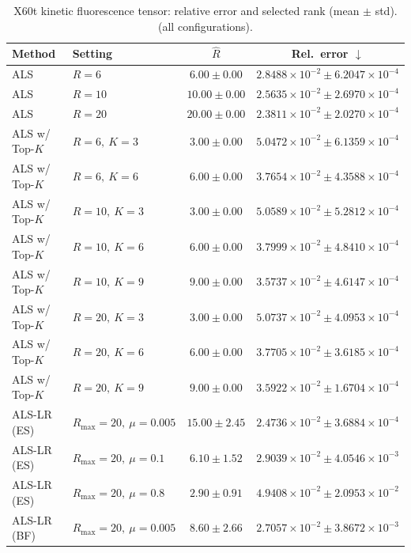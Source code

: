 \begin{table}[t]
\centering
\caption{X60t kinetic fluorescence tensor: relative error and selected rank (mean \(\pm\) std). (all configurations).}
\label{tab:results_I64x12x10x60_R0_rho0.0_noise0.0}
\begin{tabular}{@{}llcc@{}}
\toprule
Method & Setting & \(\hat R\) & Rel.\ error \(\downarrow\) \\ \midrule
ALS & \(R=6\) & \(6.00 \pm 0.00\) & \(2.8488{\times}10^{-2} \pm 6.2047{\times}10^{-4}\) \\
ALS & \(R=10\) & \(10.00 \pm 0.00\) & \(2.5635{\times}10^{-2} \pm 2.6970{\times}10^{-4}\) \\
ALS & \(R=20\) & \(20.00 \pm 0.00\) & \(2.3811{\times}10^{-2} \pm 2.0270{\times}10^{-4}\) \\
ALS w/ Top-\(K\) & \(R=6,\ K=3\) & \(3.00 \pm 0.00\) & \(5.0472{\times}10^{-2} \pm 6.1359{\times}10^{-4}\) \\
ALS w/ Top-\(K\) & \(R=6,\ K=6\) & \(6.00 \pm 0.00\) & \(3.7654{\times}10^{-2} \pm 4.3588{\times}10^{-4}\) \\
ALS w/ Top-\(K\) & \(R=10,\ K=3\) & \(3.00 \pm 0.00\) & \(5.0589{\times}10^{-2} \pm 5.2812{\times}10^{-4}\) \\
ALS w/ Top-\(K\) & \(R=10,\ K=6\) & \(6.00 \pm 0.00\) & \(3.7999{\times}10^{-2} \pm 4.8410{\times}10^{-4}\) \\
ALS w/ Top-\(K\) & \(R=10,\ K=9\) & \(9.00 \pm 0.00\) & \(3.5737{\times}10^{-2} \pm 4.6147{\times}10^{-4}\) \\
ALS w/ Top-\(K\) & \(R=20,\ K=3\) & \(3.00 \pm 0.00\) & \(5.0737{\times}10^{-2} \pm 4.0953{\times}10^{-4}\) \\
ALS w/ Top-\(K\) & \(R=20,\ K=6\) & \(6.00 \pm 0.00\) & \(3.7705{\times}10^{-2} \pm 3.6185{\times}10^{-4}\) \\
ALS w/ Top-\(K\) & \(R=20,\ K=9\) & \(9.00 \pm 0.00\) & \(3.5922{\times}10^{-2} \pm 1.6704{\times}10^{-4}\) \\
ALS-LR (ES) & \(R_{\max}=20,\ \mu=0.005\) & \(15.00 \pm 2.45\) & \(2.4736{\times}10^{-2} \pm 3.6884{\times}10^{-4}\) \\
ALS-LR (ES) & \(R_{\max}=20,\ \mu=0.1\) & \(6.10 \pm 1.52\) & \(2.9039{\times}10^{-2} \pm 4.0546{\times}10^{-3}\) \\
ALS-LR (ES) & \(R_{\max}=20,\ \mu=0.8\) & \(2.90 \pm 0.91\) & \(4.9408{\times}10^{-2} \pm 2.0953{\times}10^{-2}\) \\
ALS-LR (BF) & \(R_{\max}=20,\ \mu=0.005\) & \(8.60 \pm 2.66\) & \(2.7057{\times}10^{-2} \pm 3.8672{\times}10^{-3}\) \\

\end{tabular}
\end{table}
